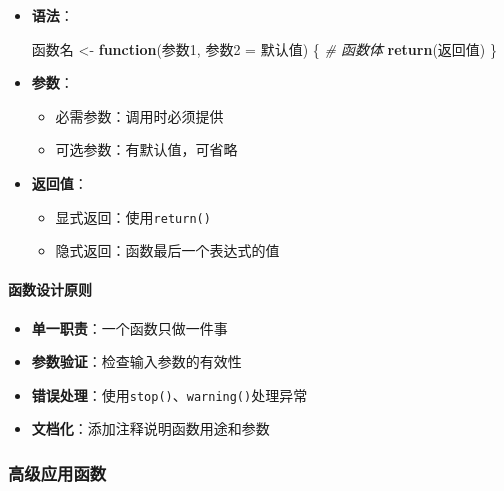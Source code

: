 \documentclass[
  twoside]{book}
\newenvironment{Shaded}{\begin{snugshade}}{\end{snugshade}}
\newcommand{\CommentTok}[1]{\textcolor[rgb]{0.56,0.35,0.01}{\textit{#1}}}
\newcommand{\ControlFlowTok}[1]{\textcolor[rgb]{0.13,0.29,0.53}{\textbf{#1}}}
\newcommand{\FunctionTok}[1]{\textcolor[rgb]{0.13,0.29,0.53}{\textbf{#1}}}
\newcommand{\NormalTok}[1]{#1}
\newcommand{\OtherTok}[1]{\textcolor[rgb]{0.56,0.35,0.01}{#1}}
\providecommand{\tightlist}{%
  \setlength{\itemsep}{0pt}\setlength{\parskip}{0pt}}
\begin{document}
\begin{itemize}
\item
  \textbf{语法}：

\begin{Shaded}
\begin{Highlighting}[]
\NormalTok{函数名 }\OtherTok{\textless{}{-}} \ControlFlowTok{function}\NormalTok{(参数1, 参数2 }\OtherTok{=}\NormalTok{ 默认值) \{}
  \CommentTok{\# 函数体}
  \FunctionTok{return}\NormalTok{(返回值)}
\NormalTok{\}}
\end{Highlighting}
\end{Shaded}
\item
  \textbf{参数}：

  \begin{itemize}
  \tightlist
  \item
    必需参数：调用时必须提供
  \item
    可选参数：有默认值，可省略
  \end{itemize}
\item
  \textbf{返回值}：

  \begin{itemize}
  \tightlist
  \item
    显式返回：使用\texttt{return()}
  \item
    隐式返回：函数最后一个表达式的值
  \end{itemize}
\end{itemize}

\hypertarget{ux51fdux6570ux8bbeux8ba1ux539fux5219}{%
\paragraph{函数设计原则}\label{ux51fdux6570ux8bbeux8ba1ux539fux5219}}

\begin{itemize}
\tightlist
\item
  \textbf{单一职责}：一个函数只做一件事
\item
  \textbf{参数验证}：检查输入参数的有效性
\item
  \textbf{错误处理}：使用\texttt{stop()}、\texttt{warning()}处理异常
\item
  \textbf{文档化}：添加注释说明函数用途和参数
\end{itemize}

\hypertarget{ux9ad8ux7ea7ux5e94ux7528ux51fdux6570}{%
\subsubsection{高级应用函数}\label{ux9ad8ux7ea7ux5e94ux7528ux51fdux6570}}
\end{document}
